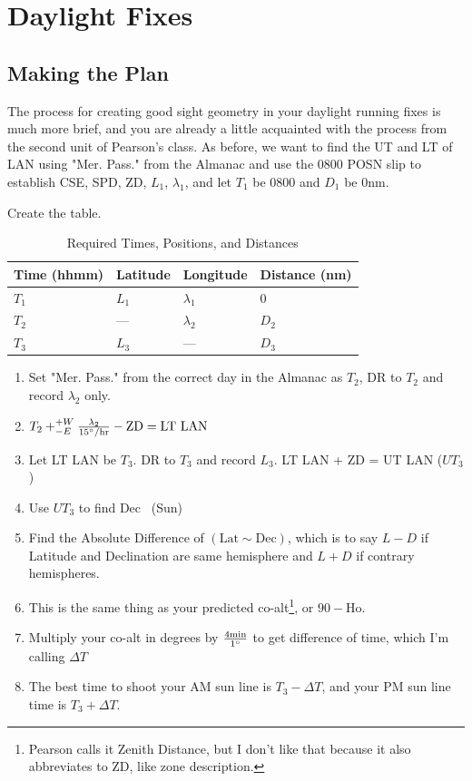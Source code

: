 \documentclass{article}
\begin{document}
\section{Daylight Fixes}
\subsection{Making the Plan}
The process for creating good sight geometry in your daylight running fixes is much more brief, and you are already a little acquainted with the process from the second unit of Pearson's class. As before, we want to find the UT and LT of LAN using "Mer. Pass." from the Almanac and use the 0800 POSN slip to establish CSE, SPD, ZD, $L_1$, $\lambda_1$, and let $T_1$ be 0800 and $D_1$ be 0nm.

Create the table.
\begin{table}[h]
\centering
\begin{tabular}{|l|l|l|l|}

\hline
Time (hhmm) & Latitude & Longitude & Distance (nm)\\
\hline
$T_1$ & $L_1$ & $\lambda_1$ & 0 \\ %
\hline
$T_2$ & --- & $\lambda_2$ & $D_2$ \\ %
\hline
$T_3$ & $L_3$ & --- & $D_3$ \\ %
\hline
\end{tabular}
\caption{Required Times, Positions, and Distances}
\label{tab:sunlight positions}
\end{table}
\begin{enumerate}
    \item Set "Mer. Pass." from the correct day in the Almanac as $T_2$, DR to $T_2$ and record $\lambda_2$ only.
    \item \(T_2+^{+W}_{-E}\frac{\lambda_2}{{15}\degree/\text{hr}}-\text{ZD}=\text{LT LAN}\)
    \item Let LT LAN be $T_3$. DR to $T_3$ and record $L_3$. LT LAN + ZD = UT LAN ($UT_3$)
    \item Use $UT_3$ to find Dec \astrosun\ (Sun)
    \item Find the Absolute Difference of \((\text{Lat}\sim \text{Dec})\), which is to say $L-D$ if Latitude and Declination are same hemisphere and $L+D$ if contrary hemispheres.
    \item This is the same thing as your predicted co-alt\footnote{Pearson calls it Zenith Distance, but I don't like that because it also abbreviates to ZD, like zone description.}, or \(90-\text{Ho}\).
    \item Multiply your co-alt in degrees by \(\frac{4\text{min}}{1\degree}\) to get difference of time, which I'm calling \(\Delta T\)
    \item The best time to shoot your AM sun line is \(T_3-\Delta T\), and your PM sun line time is \(T_3+\Delta T\).
\end{enumerate}
\end{document}
